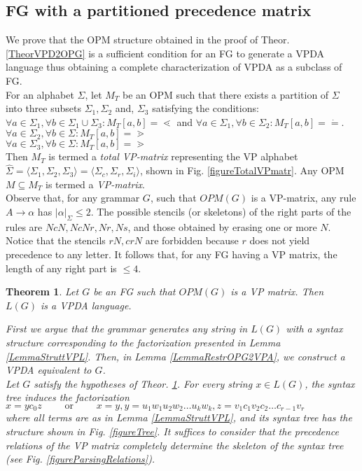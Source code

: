 \documentclass[3p,11pt]{elsarticle}
\newtheorem{theorem}{Theorem}[section]
\newenvironment{proof}[1][Proof]{\begin{trivlist}
\item[\hskip \labelsep {\bfseries #1}]}{\end{trivlist}}
\begin{document}
\subsection*{FG with a partitioned precedence matrix}\label{SectRestrOPGareVPL}
We prove that the OPM structure obtained in the proof of Theor. \ref{TheorVPD2OPG} is a sufficient condition for an FG to generate a VPDA language thus obtaining a complete characterization of VPDA as a subclass of FG.
\\
For an alphabet $\Sigma$, let $M_T$ be an OPM such that there exists a partition of $\Sigma$ into three subsets $\Sigma_1, \Sigma_2$ and, $\Sigma_3$ satisfying the conditions:
\\
$ \forall a\in \Sigma_1,\forall  b\in \Sigma_1\cup\Sigma_3 : M_T[a,b]=\lessdot  $ and $ \forall a\in \Sigma_1,\forall b\in \Sigma_2 : M_T[a,b]=\dot=.$
\\
$ \forall a\in \Sigma_2,\forall  b\in \Sigma : M_T[a,b]=\gtrdot  $
\\
$ \forall a\in \Sigma_3,\forall  b\in \Sigma : M_T[a,b]=\gtrdot  $
\\
Then $M_T$ is termed a \emph{total VP-matrix}  representing the VP alphabet $\widehat{\Sigma} =\langle \Sigma_1, \Sigma_2,\Sigma_3\rangle= \langle \Sigma_c,\Sigma_r, \Sigma_i \rangle$, shown in Fig. \ref{figureTotalVPmatr}. Any OPM $M \subseteq M_T$ is termed a \emph{VP-matrix}.
\\
Observe that, for any  grammar $G$, such that $OPM(G)$ is a VP-matrix, any rule $A\to \alpha$ has $|\alpha|_{\Sigma}\leq 2$. The possible stencils (or skeletons) of the right parts of the rules are $NcN, NcNr, Nr, Ns$, and those obtained by erasing one or more $N$. Notice that the stencils $rN, crN$ are forbidden because $r$ does not yield precedence to any letter. It follows that, for any FG having a VP matrix, the length of any right part is $\leq 4$.
\begin{theorem}\label{TheorRestrOPGisVP}
Let $G$ be an FG such that $OPM(G)$ is a VP matrix. Then $L(G)$ is a VPDA language.
\begin{proof}
First we argue that the grammar generates any string in $L(G)$ with a syntax structure corresponding to the factorization presented in Lemma \ref{LemmaStruttVPL}. Then, in Lemma \ref{LemmaRestrOPG2VPA}, we construct a VPDA equivalent to $G$.
\\
Let $G$ satisfy the hypotheses of Theor. \ref{TheorRestrOPGisVP}. For every string $x\in L(G)$, the syntax tree induces the factorization\\
$ x = y c_0 z \qquad\text{  or  }\qquad x = y,  y=u_1 w_1 u_2 w_2 \ldots u_k w_k, z = v_1 c_1 v_2 c_2 \ldots c_{r-1} v_r $
\\where all terms are as
in Lemma \ref{LemmaStruttVPL}, and its syntax tree has the structure shown in Fig. \ref{figureTree}. It suffices to consider that the precedence relations of the VP matrix completely determine the skeleton of the syntax tree (see Fig. \ref{figureParsingRelations}).
\end{proof}
\end{theorem}
\end{document}
